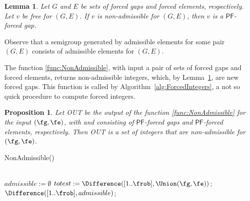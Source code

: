 \documentclass[11pt]{amsart}
\newtheorem{lemma}[theorem]{Lemma}
\newtheorem{proposition}[theorem]{Proposition}
\theoremstyle{remark}
\begin{document}
\begin{lemma}\label{lemma:admissible_ints}
Let  $G$ and $E$ be sets of forced gaps and forced elements, respectively. Let $v$ be free for $(G,E)$. If $v$ is non-admissible for $(G,E)$, then $v$ is a {\ensuremath{\mathsf{PF}}}-forced gap.
\end{lemma}
Observe that a semigroup generated by admissible elements for some pair $(G,E)$ consists of admissible elements for $(G,E)$.

The function \ref{func:NonAdmissible}, with input a pair of sets of forced gaps and forced elements, returns non-admissible integers, which, by Lemma~\ref{lemma:admissible_ints}, are new forced gaps. This function is called by Algorithm~\ref{alg:ForcedIntegers}, a not so quick procedure to compute forced integers.
\begin{proposition}\label{prop:correction_NonAdmissible}
Let \textsf{OUT} be the output of the function \ref{func:NonAdmissible} for the input  $(\fg,\fe)$, with \fg and \fe consisting of {\ensuremath{\mathsf{PF}}}-forced gaps and {\ensuremath{\mathsf{PF}}}-forced elements, respectively. Then \textsf{OUT} is a set of integers that are non-admissible for $(\fg,\fe)$.
\end{proposition}
\begin{function}[ht]\caption{NonAdmissible()\label{func:NonAdmissible}}
\NonAdmissiblew{\fg,\fe}\\
    $admissible := \emptyset$\;
    $totest := \Difference([1..\frob], \Union(\fg,\fe))$;\\
  \Return $\Difference([1..\frob], admissible)$;
\end{function}
\end{document}
